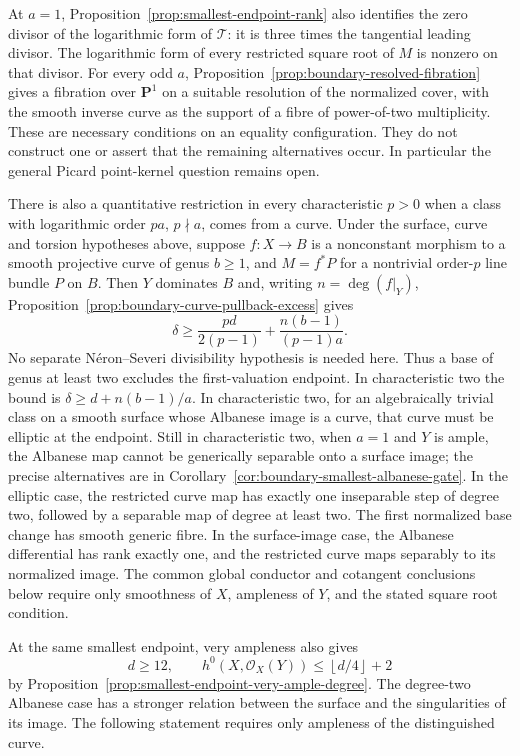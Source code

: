 \documentclass[11pt]{article}
\theoremstyle{remark}\newtheorem{remark}[theorem]{Remark}
\newcommand{\OO}{\mathcal O}
\newcommand{\PP}{\mathbf P}
\begin{document}
At $a=1$, Proposition~\ref{prop:smallest-endpoint-rank} also
identifies the zero divisor of the logarithmic form of $\mathcal T$:
it is three times the tangential leading divisor. The logarithmic form
of every restricted square root of $M$ is nonzero on that divisor.
For every odd $a$, Proposition~\ref{prop:boundary-resolved-fibration}
gives a fibration over $\PP^1$ on a suitable resolution of the normalized
cover, with the smooth inverse curve as the support of a fibre of
power-of-two multiplicity.
These are necessary conditions on an equality configuration.
They do not construct one or assert that the remaining alternatives
occur. In particular the general Picard point-kernel question
remains open.

There is also a quantitative restriction in every characteristic $p>0$
when a class with logarithmic order $pa$, $p\nmid a$, comes from a curve.
Under the surface, curve and torsion hypotheses above, suppose
$f:X\to B$ is a nonconstant morphism to a smooth projective curve
of genus $b\geq1$, and $M=f^*P$ for a nontrivial order-$p$ line
bundle $P$ on $B$. Then $Y$ dominates $B$ and, writing
$n=\deg(f|_Y)$, Proposition~\ref{prop:boundary-curve-pullback-excess}
gives
\[
 \delta\geq\frac{pd}{2(p-1)}+
                  \frac{n(b-1)}{(p-1)a}.
\]
No separate N\'eron--Severi divisibility hypothesis is needed here.
Thus a base of genus at least two excludes the first-valuation endpoint.
In characteristic two the bound is $\delta\geq d+n(b-1)/a$.
In characteristic two, for an algebraically trivial class on a smooth surface whose
Albanese image is a curve, that curve must be elliptic at the endpoint.
Still in characteristic two, when $a=1$ and $Y$ is ample, the Albanese map cannot be
generically separable onto a surface image; the precise alternatives
are in Corollary~\ref{cor:boundary-smallest-albanese-gate}.
In the elliptic case, the restricted curve map has exactly one
inseparable step of degree two, followed by a separable map of degree
at least two. The first normalized base change has smooth generic
fibre. In the surface-image case, the Albanese differential has rank
exactly one, and the restricted curve maps separably to its normalized
image. The common global conductor and cotangent conclusions below
require only smoothness of $X$, ampleness of $Y$, and the stated square
root condition.

At the same smallest endpoint, very ampleness also gives
\[
 d\ge12,\qquad
 h^0(X,\OO_X(Y))\le\left\lfloor d/4\right\rfloor+2
\]
by Proposition~\ref{prop:smallest-endpoint-very-ample-degree}.
The degree-two Albanese case has a stronger relation between the
surface and the singularities of its image.  The following statement
requires only ampleness of the distinguished curve.
\end{document}

